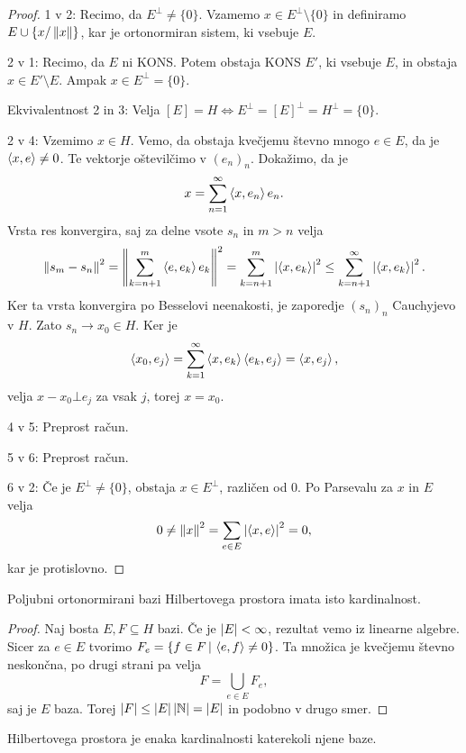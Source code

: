 \begin{proof}
  1 v 2:
  Recimo, da $E^\bot \ne \{0\}$.
  Vzamemo $x \in E^\bot \setminus \{0\}$ in definiramo $E \cup \{x /
  \left\lVert x\right\rVert\}$, kar je ortonormiran sistem, ki vsebuje $E$.
  \protislovje{}

  2 v 1:
  Recimo, da $E$ ni KONS\@.
  Potem obstaja KONS $E'$, ki vsebuje $E$, in obstaja $x \in E' \setminus E$.
  Ampak $x \in E^\bot = \{0\}$.
  \protislovje{}

  Ekvivalentnost 2 in 3:
  Velja $[E] = H \iff E^\bot = [E]^\bot = H^\bot = \{0\}$.

  2 v 4:
  Vzemimo $x \in H$.
  Vemo, da obstaja kvečjemu števno mnogo $e \in E$, da je $\left< x,e \right> \ne 0$.
  Te vektorje oštevilčimo v $(e_n)_n$.
  Dokažimo, da je
  \[
	x = \sum_{n=1}^\infty \left< x, e_n \right> e_n.
  \]
  Vrsta res konvergira, saj za delne vsote $s_n$ in $m > n$ velja
  \[
	\left\lVert s_m - s_n\right\rVert^2 = \left\lVert\sum_{k=n+1}^m \left< e, e_k \right> e_k\right\rVert^2
	= \sum_{k=n+1}^m \left| \left< x, e_k \right> \right|^2
	\le \sum_{k=n+1}^\infty \left| \left< x, e_k \right> \right|^2.
  \]
  Ker ta vrsta konvergira po Besselovi neenakosti, je zaporedje $(s_n)_n$
  Cauchyjevo v $H$.
  Zato $s_n \to x_0 \in H$.
  Ker je
  \[
	\left< x_0, e_j \right> = \sum_{k=1}^\infty \left< x, e_k \right> \left< e_k, e_j \right> = \left< x, e_j \right>,
  \]
  velja $x - x_0 \bot e_j$ za vsak $j$, torej $x = x_0$.

  4 v 5:
  Preprost račun.

  5 v 6:
  Preprost račun.

  6 v 2:
  Če je $E^\bot \ne \{0\}$, obstaja $x \in E^\bot$, različen od $0$.
  Po Parsevalu za $x$ in $E$ velja
  \[
	0 \ne \left\lVert x\right\rVert^2 = \sum_{e \in E} \left| \left< x, e \right> \right|^2 = 0,
  \]
  kar je protislovno.
  \protislovje{}
\end{proof}

\begin{trditev}
  Poljubni ortonormirani bazi Hilbertovega prostora imata isto kardinalnost.
\end{trditev}

\begin{proof}
  Naj bosta $E, F \subseteq H$ bazi.
  Če je $\left| E \right| < \infty$, rezultat vemo iz linearne algebre.
  Sicer za $e \in E$ tvorimo $F_e = \{f \in F \,|\, \left< e,f \right> \ne 0\}$.
  Ta množica je kvečjemu števno neskončna, po drugi strani pa velja
  \[
	F = \bigcup_{e \in E} F_e,
  \]
  saj je $E$ baza.
  Torej $\left| F \right| \le \left| E \right| \left| \mathbb{N} \right| = \left| E \right|$ in podobno v drugo smer.
\end{proof}

\begin{definicija}
   Hilbertovega prostora je enaka kardinalnosti katerekoli
  njene baze.
\end{definicija}

